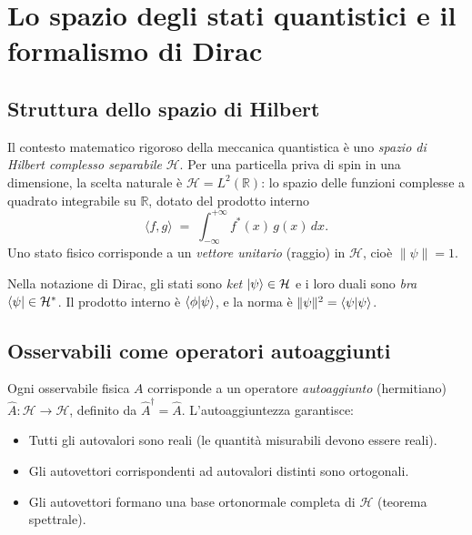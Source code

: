 \documentclass[12pt, a4paper]{article}
\begin{document}
\clearpage

\appendix

\section{Lo spazio degli stati quantistici e il formalismo di Dirac}
\label{app:hilbert}

\subsection{Struttura dello spazio di Hilbert}

Il contesto matematico rigoroso della meccanica quantistica è uno
\emph{spazio di Hilbert complesso separabile} $\mathcal{H}$. Per una
particella priva di spin in una dimensione, la scelta naturale è
$\mathcal{H} = L^2(\mathbb{R})$: lo spazio delle funzioni complesse
a quadrato integrabile su $\mathbb{R}$, dotato del prodotto interno
\begin{equation}
  \langle f, g\rangle \;=\; \int_{-\infty}^{+\infty} f^*(x)\,g(x)\,dx.
\end{equation}
Uno stato fisico corrisponde a un \emph{vettore unitario} (raggio) in
$\mathcal{H}$, cioè $\|\psi\| = 1$.

Nella notazione di Dirac, gli stati sono \emph{ket} $\ket{\psi} \in \mathcal{H}$
e i loro duali sono \emph{bra} $\bra{\psi} \in \mathcal{H}^*$.
Il prodotto interno è $\braket{\phi}{\psi}$, e la norma è
$\|\psi\|^2 = \braket{\psi}{\psi}$.

\subsection{Osservabili come operatori autoaggiunti}

Ogni osservabile fisica $A$ corrisponde a un operatore \emph{autoaggiunto}
(hermitiano) $\hat{A}: \mathcal{H} \to \mathcal{H}$, definito da
$\hat{A}^\dagger = \hat{A}$. L'autoaggiuntezza garantisce:
\begin{itemize}
  \item Tutti gli autovalori sono reali (le quantità misurabili devono essere reali).
  \item Gli autovettori corrispondenti ad autovalori distinti sono ortogonali.
  \item Gli autovettori formano una base ortonormale completa di $\mathcal{H}$
        (teorema spettrale).
\end{itemize}
\end{document}
